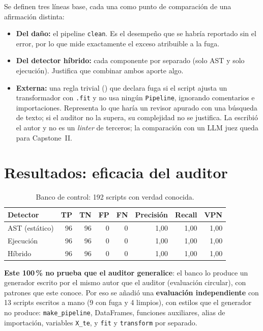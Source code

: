 Se definen tres líneas base, cada una como punto de comparación de una afirmación distinta:
\begin{itemize}
  \item \textbf{Del daño:} el pipeline \texttt{clean}. Es el desempeño que se habría reportado sin el error, por lo que \DOpt{} mide exactamente el exceso atribuible a la fuga.
  \item \textbf{Del detector híbrido:} cada componente por separado (solo AST y solo ejecución). Justifica que combinar ambos aporte algo.
  \item \textbf{Externa:} una regla trivial () que declara fuga si el script ajusta un transformador con \texttt{.fit} y no usa ningún \texttt{Pipeline}, ignorando comentarios e importaciones. Representa lo que haría un revisor apurado con una búsqueda de texto; si el auditor no la supera, su complejidad no se justifica. La escribió el autor y no es un \emph{linter} de terceros; la comparación con un LLM juez queda para Capstone~II.
\end{itemize}

\section{Resultados: eficacia del auditor}
\label{sec:eficacia}

\begin{table}[!htbp]
\centering
\caption{Banco de control: 192 scripts con verdad conocida.}
\label{tab:banco}
\begingroup\footnotesize\singlespacing
\begin{tabular}{@{}l r r r r r r r@{}}
\toprule
Detector & TP & TN & FP & FN & Precisión & Recall & VPN \\
\midrule
AST (estático) & 96 & 96 & 0 & 0 & 1,00 & 1,00 & 1,00 \\
Ejecución & 96 & 96 & 0 & 0 & 1,00 & 1,00 & 1,00 \\
Híbrido & 96 & 96 & 0 & 0 & 1,00 & 1,00 & 1,00 \\
\bottomrule
\end{tabular}
\endgroup
\end{table}

\textbf{Este 100\,\% no prueba que el auditor generalice}: el banco lo produce un generador escrito por el mismo autor que el auditor (evaluación circular), con patrones que este conoce. Por eso se añadió una \textbf{evaluación independiente} con 13 scripts escritos a mano (9 con fuga y 4 limpios), con estilos que el generador no produce: \texttt{make\_pipeline}, DataFrames, funciones auxiliares, alias de importación, variables \texttt{X\_te}, y \texttt{fit} y \texttt{transform} por separado.

